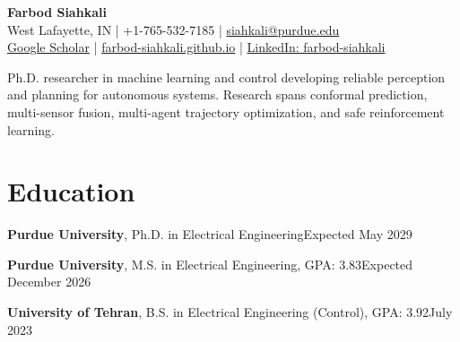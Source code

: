\documentclass[letterpaper,11pt]{article}
\newcommand{\degree}[3]{\textbf{#1}, #2\hfill #3\par}
\begin{document}
\fontsize{10.5}{12.3}\selectfont
\begin{center}
{\fontsize{23}{25}\selectfont\bfseries Farbod Siahkali}\\[3pt]
West Lafayette, IN | +1-765-532-7185 | \href{mailto:siahkali@purdue.edu}{siahkali@purdue.edu}\\[2pt]
\href{https://scholar.google.com/citations?user=-99KSTsAAAAJ\&hl=en}{Google Scholar} | \href{https://farbod-siahkali.github.io/}{farbod-siahkali.github.io} | \href{https://www.linkedin.com/in/farbod-siahkali/}{LinkedIn: farbod-siahkali}
\end{center}
\vspace{-6pt}
Ph.D. researcher in machine learning and control developing reliable perception and planning for autonomous systems. Research spans conformal prediction, multi-sensor fusion, multi-agent trajectory optimization, and safe reinforcement learning.

\section{Education}
\degree{Purdue University}{Ph.D. in Electrical Engineering}{Expected May 2029}
\degree{Purdue University}{M.S. in Electrical Engineering, GPA: 3.83}{Expected December 2026}
\degree{University of Tehran}{B.S. in Electrical Engineering (Control), GPA: 3.92}{July 2023}
\end{document}
